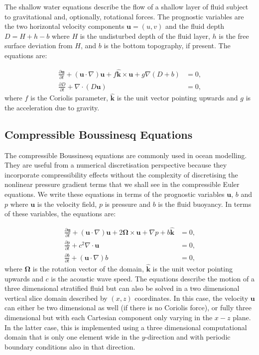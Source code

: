 \documentclass[journal abbreviation, manuscript]{copernicus}
\def\MM#1{\boldsymbol{#1}}
\newcommand{\pp}[2]{\frac{\partial #1}{\partial #2}}
\begin{document}
The shallow water equations describe the flow of a shallow layer of
fluid subject to gravitational and, optionally, rotational forces. The
prognostic variables are the two horizontal velocity components
$\MM{u} = (u, v)$ and the fluid depth $D = H + h - b$ where $H$ is the
undisturbed depth of the fluid layer, $h$ is the free surface
deviation from $H$, and $b$ is the bottom topography, if present. The
equations are:

\begin{align}
  \pp{\MM{u}}{t} + (\MM{u}\cdot\nabla)\MM{u} + f\hat{\MM{k}}\times\MM{u} + g\nabla (D+b) &= 0, \\
  \pp{D}{t} + \nabla\cdot(D\MM{u}) &= 0,
\end{align}
where $f$ is the Coriolis parameter, $\hat{\MM{k}}$ is the unit vector
pointing upwards and $g$ is the acceleration due to gravity.

\subsection{Compressible Boussinesq Equations}
The compressible Boussinesq equations are commonly used in ocean
modelling. They are useful from a numerical discretisation perspective
because they incorporate compressibility effects without the
complexity of discretising the nonlinear pressure gradient terms that
we shall see in the compressible Euler equations. We write these
equations in terms of the prognostic variables $\MM{u}$, $b$ and $p$
where $\MM{u}$ is the velocity field, $p$ is pressure and $b$ is the
fluid buoyancy. In terms of these variables, the equations are:

\begin{align}
  \pp{\MM{u}}{t} + 
  (\MM{u}\cdot\nabla)\MM{u} +
  2\MM{\Omega}\times \MM{u} + \nabla p + b\hat{\MM{k}} & = 0, \\
  \pp{p}{t} + c^2\nabla\cdot\MM{u} & = 0, \\
  \pp{b}{t} + (\MM{u}\cdot\nabla) b & = 0,
\end{align}
where $\MM{\Omega}$ is the rotation vector of the domain,
$\hat{\MM{k}}$ is the unit vector pointing upwards and $c$ is the
acoustic wave speed. The equations describe the motion of a
three dimensional stratified fluid but can also be solved in a
two dimensional vertical slice domain described by $(x, z)$
coordinates. In this case, the velocity $\MM{u}$ can either be
two dimensional as well (if there is no Coriolis force), or fully
three dimensional but with each Cartesian component only varying in
the $x-z$ plane. In the latter case, this is implemented using a
three dimensional computational domain that is only one element wide
in the $y$-direction and with periodic boundary conditions also in
that direction.
\end{document}
